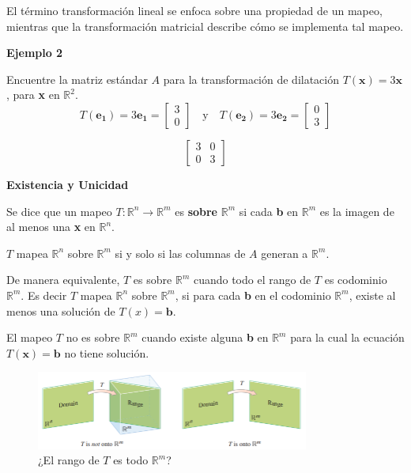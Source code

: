 \documentclass{article}
\begin{document}
El término transformación lineal se enfoca sobre una propiedad de un mapeo, mientras que la transformación matricial describe cómo se implementa tal mapeo.

\begin{large}
    \textbf{Ejemplo 2}
\end{large}

Encuentre la matriz estándar $A$ para la transformación de dilatación $T(\mathbf{x}) = 3\mathbf{x}$, para \textbf{x} en $\mathbb{R}^2$. $$T(\mathbf{e_1}) = 3\mathbf{e_1} = \begin{bmatrix} 3 \\ 0 \end{bmatrix} \quad \text{y} \quad T(\mathbf{e_2}) = 3\mathbf{e_2} = \begin{bmatrix} 0 \\ 3 \end{bmatrix}$$

\begin{equation*}
    \begin{bmatrix}
        3 & 0 \\
        0 & 3
    \end{bmatrix}
\end{equation*}

\begin{large}
    \textbf{Existencia y Unicidad}
\end{large}

\begin{tcolorbox}[colback=blue!10!white,colframe=blue!60!black,title=Existencia]
    Se dice que un mapeo $T: \mathbb{R}^n \rightarrow \mathbb{R}^m$ es \textbf{sobre} $\mathbb{R}^m$ si cada \textbf{b} en $\mathbb{R}^m$ es la imagen de al menos una \textbf{x} en $\mathbb{R}^n$. 

    $T$ mapea $\mathbb{R}^n$ sobre $\mathbb{R}^m$ si y solo si las columnas de $A$ generan a $\mathbb{R}^m$.
\end{tcolorbox}

De manera equivalente, $T$ es sobre $\mathbb{R}^m$ cuando todo el rango de $T$ es codominio $\mathbb{R}^m$. Es decir $T$ mapea $\mathbb{R}^n$ sobre $\mathbb{R}^m$, si para cada \textbf{b} en el codominio $\mathbb{R}^m$, existe al menos una solución de $T(x)=\mathbf{b}$.

El mapeo $T$ no es sobre $\mathbb{R}^m$ cuando existe alguna \textbf{b} en $\mathbb{R}^m$ para la cual la ecuación $T(\mathbf{x}) = \mathbf{b}$ no tiene solución.

\begin{figure}[ht]
  \centerline{\includegraphics[width=0.8\textwidth]{image22.png}}
  \caption{¿El rango de $T$ es todo $\mathbb{R}^m$?}
\end{figure}
\end{document}
